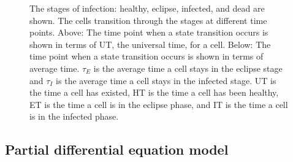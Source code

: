 \begin{figure}
\begin{tikzpicture}
    \end{tikzpicture}
\caption{The stages of infection: healthy, eclipse, infected, and dead are shown. The cells transition through the stages at different time points. Above: The time point when a state transition occurs is shown in terms of UT, the universal time, for a cell. Below: The time point when a state transition occurs is shown in terms of average time. $\tau_E$ is the average time a cell stays in  the eclipse stage and $\tau_I$ is the average time a cell stays in the infected stage. UT is the time a cell has existed, HT is the time a cell has been healthy, ET is the time a cell is in the eclipse phase, and IT is the time a cell is in the infected phase. \label{fig:transitioning_through_the_stages_of_infection}}
\end{figure}

\subsection{Partial differential equation model} \label{PDM}

